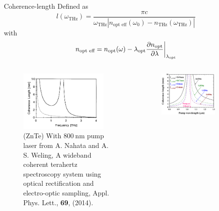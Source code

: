 \documentclass[aspectratio=1610, 9pt]{beamer}
\begin{document}
\begin{frame}{Coherence-length}
Defined as \nocite{coherence_legnth}
\begin{equation}
    l(\omega_{\text{THz}}) = \frac{\pi c}{\omega_{\text{THz}} \left | n_\text{opt eff}(\omega_0) - n_{\text{THz}}(\omega_{\text{THz}})\right |}
\end{equation}
with 
\begin{equation}
    n_{\text{opt eff}} = n_\text{opt}(\omega) - \lambda_\text{opt}\frac{\partial n_\text{opt}}{\partial \lambda}\biggl{|}_{\lambda_\text{opt}}  
\end{equation}
\begin{center}
  \begin{columns}
    \begin{column}{.4\textwidth}
    \begin{figure}
      \includegraphics[width=0.9\textwidth]{images/coherence_length_ZnTe.png}
      \caption{\tiny{\textcolor{tugreen}{(ZnTe) With $\SI{800}{\nano\meter}$ pump laser} from  A. Nahata and A. S. Weling, A wideband coherent terahertz spectroscopy system using optical rectification and electro-optic sampling, Appl. Phys. Lett., \textbf{69}, (2014)\nocite{coherence_legnth}.}}
    \end{figure}%
    \end{column}
    \begin{column}{.4\textwidth}
    \begin{figure}
      \includegraphics[width=0.8\textwidth]{images/GAP_coherencelength.png}

\end{figure}
\end{column}
\end{columns}
\end{center}
\end{frame}
\end{document}
